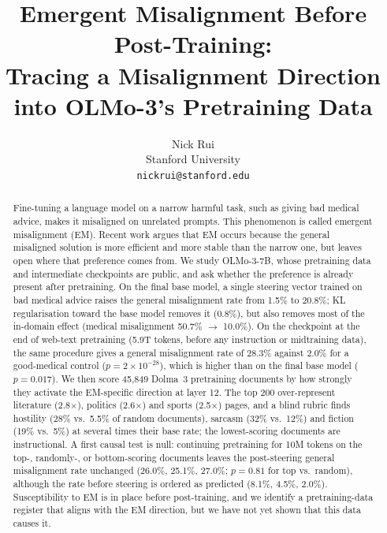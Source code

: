 \documentclass{article}
\title{Emergent Misalignment Before Post-Training:\\
Tracing a Misalignment Direction into OLMo-3's Pretraining Data}
\author{
  Nick Rui\\
  Stanford University\\
  \texttt{nickrui@stanford.edu}
}
\begin{document}
\maketitle

\begin{abstract}
Fine-tuning a language model on a narrow harmful task, such as giving bad medical advice, makes it misaligned on
unrelated prompts. This phenomenon is called emergent misalignment (EM). Recent work argues that EM occurs because
the general misaligned solution is more efficient and more stable than the narrow one, but leaves open where that
preference comes from. We study OLMo-3-7B, whose pretraining data and intermediate checkpoints are public, and ask
whether the preference is already present after pretraining. On the final base model, a single steering vector
trained on bad medical advice raises the general misalignment rate from 1.5\% to 20.8\%; KL regularisation toward
the base model removes it (0.8\%), but also removes most of the in-domain effect (medical misalignment 50.7\%
$\to$ 10.0\%). On the checkpoint at the end of web-text pretraining (5.9T tokens, before any instruction or
midtraining data), the same procedure gives a general misalignment rate of 28.3\% against 2.0\% for a good-medical
control ($p=2\times10^{-28}$), which is higher than on the final base model ($p=0.017$). We then score 45{,}849 Dolma~3
pretraining documents by how strongly they activate the EM-specific direction at layer 12. The top 200 over-represent
literature (2.8$\times$), politics (2.6$\times$) and sports (2.5$\times$) pages, and a blind rubric finds hostility (28\%
vs.\ 5.5\% of random documents), sarcasm (32\% vs.\ 12\%) and fiction (19\% vs.\ 5\%) at several times their base
rate; the lowest-scoring documents are instructional. A first causal test is null: continuing pretraining for
10M tokens on the top-, randomly-, or bottom-scoring documents leaves the post-steering general misalignment rate
unchanged (26.0\%, 25.1\%, 27.0\%; $p=0.81$ for top vs.\ random), although the rate before steering is ordered as
predicted (8.1\%, 4.5\%, 2.0\%). Susceptibility to EM is in place before post-training, and we identify a
pretraining-data register that aligns with the EM direction, but we have not yet shown that this data causes it.
\end{abstract}

{\let\thefootnote\relax{}}
\end{document}
